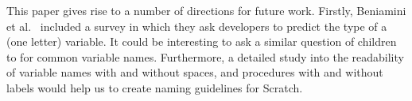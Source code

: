\documentclass[conference]{IEEEtran}
\begin{document}
This paper gives rise to a number of directions for future work. Firstly, Beniamini et al.~\cite{Beniamini} included a survey in which they ask developers to predict the type of a (one letter) variable. It could be interesting to ask a similar question of children to for common variable names. Furthermore, a detailed study into the readability of variable names with and without spaces, and procedures with and without labels would help us to create naming guidelines for Scratch.








%

\end{document}
